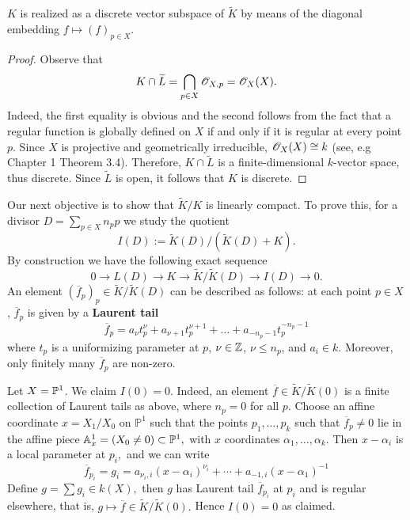 \begin{proposition}\label{prop:K-discrete-in-adèle}
	$K$ is realized as a discrete vector subspace of $\widetilde{K}$ by means of the diagonal embedding $f \mapsto (f)_{p\in X}$. 
\end{proposition}
\begin{proof}
	Observe that 
	\[
		K\cap \widetilde{L} = \bigcap_{p\in X}\O_{X,p} = \O_{X}(X).
	\]
	Indeed, the first equality is obvious and the second follows from the fact that a regular function is globally defined on $X$ if and only if it is regular at every point $p$. Since $X$ is projective and geometrically irreducible, $\O_{X}(X) \cong k$ (see, e.g \cite{hartshorne} Chapter 1 Theorem 3.4). Therefore, $K\cap \widetilde{L}$ is a finite-dimensional $k$-vector space, thus discrete. Since $\widetilde{L}$ is open, it follows that $K$ is discrete. 
\end{proof}
Our next objective is to show that $\widetilde{K}/K$ is linearly compact. To prove this, for a divisor $D = \sum_{p\in X}n_{p}p$ we study the quotient
\[
	I(D) := \widetilde{K}(D)/(\widetilde{K}(D) + K).
\]
By construction we have the following exact sequence
\[
	0 \to L(D) \to K \to \widetilde{K}/\widetilde{K}(D) \to I(D) \to 0.
\]
An element $(\overline{f}_{p})_{p}\in \widetilde{K}/\widetilde{K}(D)$ can be described as follows: at each point $p \in X$, $\overline{f}_{p}$ is given by a \textbf{Laurent tail}
\[
	\overline{f}_{p} = a_{\nu}t_{p}^{\nu} + a_{\nu + 1}t_{p}^{\nu+1} + \ldots + a_{-n_{p}-1}t_{p}^{-n_{p}-1}
\]
where $t_{p}$ is a uniformizing parameter at $p$, $\nu\in \Z$, $\nu\leq n_{p}$, and $a_{i}\in k$. Moreover, only finitely many $\overline{f}_{p}$ are non-zero.
\begin{example}\label{ex:I(D)-for-P^1}
	Let $X = \P^{1}$. We claim $I(0) = 0$. Indeed, an element $\overline { f } \in \widetilde{K} / \widetilde{K} ( 0 )$ is a finite collection of Laurent tails as above, where $n _ { p } = 0$ for all $p .$ Choose an affine coordinate $x = X _ { 1 } / X _ { 0 }$ on $\mathbb { P } ^ { 1 }$ such that the points $p _ { 1 } , \ldots , p _ { k }$ such that $\overline { f } _ { p } \neq 0$ lie in the affine piece $\A _ { x } ^ { 1 } = \left( X _ { 0 } \neq 0 \right) \subset \mathbb { P } ^ { 1 } ,$ with $x$ coordinates $\alpha _ { 1 } , \ldots , \alpha _ { k } .$ Then $x - \alpha _ { i }$ is a local parameter at $p _ { i } ,$ and we can write 
	\[
		\overline { f } _ { p_ { i } } = g _ { i } = a _ { \nu _ { i } , i } \left( x - \alpha _ { i } \right) ^ { \nu _ { i } } + \cdots + a _ { - 1 , i } ( x - \alpha_{1} ) ^ { - 1 }
	\]
	Define $g = \sum g _ { i } \in k ( X ) ,$ then $g$ has Laurent tail $\overline { f } _ { p _ { i } }$ at $p _ { i }$ and is regular elsewhere, that is, $g \mapsto \overline { f } \in \widetilde{K}/ \widetilde{K} ( 0 ) .$ Hence $I ( 0 ) = 0$ as claimed.
\end{example}
